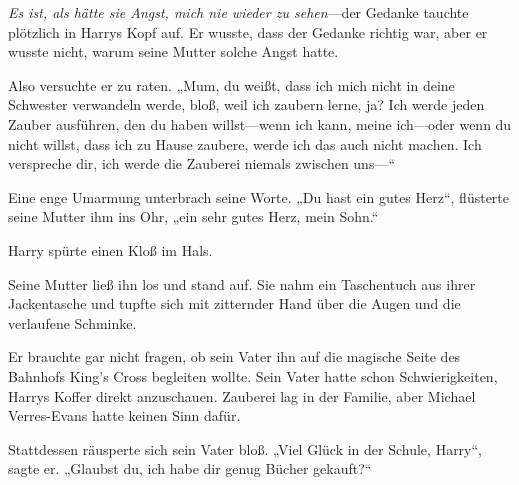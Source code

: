 \emph{Es ist, als hätte sie Angst, mich nie wieder zu sehen}—der Gedanke tauchte plötzlich in Harrys Kopf auf. Er wusste, dass der Gedanke richtig war, aber er wusste nicht, warum seine Mutter solche Angst hatte.

Also versuchte er zu raten. „Mum, du weißt, dass ich mich nicht in deine Schwester verwandeln werde, bloß, weil ich zaubern lerne, ja? Ich werde jeden Zauber ausführen, den du haben willst—wenn ich kann, meine ich—oder wenn du nicht willst, dass ich zu Hause zaubere, werde ich das auch nicht machen. Ich verspreche dir, ich werde die Zauberei niemals zwischen uns—“

Eine enge Umarmung unterbrach seine Worte. „Du hast ein gutes Herz“, flüsterte seine Mutter ihm ins Ohr, „ein sehr gutes Herz, mein Sohn.“

Harry spürte einen Kloß im Hals.

Seine Mutter ließ ihn los und stand auf. Sie nahm ein Taschentuch aus ihrer Jackentasche und tupfte sich mit zitternder Hand über die Augen und die verlaufene Schminke.

Er brauchte gar nicht fragen, ob sein Vater ihn auf die magische Seite des Bahnhofs King’s Cross begleiten wollte. Sein Vater hatte schon Schwierigkeiten, Harrys Koffer direkt anzuschauen. Zauberei lag in der Familie, aber Michael Verres-Evans hatte keinen Sinn dafür.

Stattdessen räusperte sich sein Vater bloß. „Viel Glück in der Schule, Harry“, sagte er. „Glaubst du, ich habe dir genug Bücher gekauft?“

